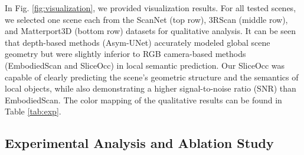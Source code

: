 \documentclass[letterpaper, 10 pt, conference]{ieeeconf}  %
\begin{document}
In Fig. \ref{fig:visualization}, we provided visualization results. For all tested scenes, we selected one scene each from the ScanNet (top row), 3RScan (middle row), and Matterport3D (bottom row) datasets for qualitative analysis. It can be seen that depth-based methods (Asym-UNet) accurately modeled global scene geometry but were slightly inferior to RGB camera-based methods (EmbodiedScan and SliceOcc) in local semantic prediction. Our SliceOcc was capable of clearly predicting the scene's geometric structure and the semantics of local objects, while also demonstrating a higher signal-to-noise ratio (SNR) than EmbodiedScan. The color mapping of the qualitative results can be found in Table \ref{tab:exp}.


\begin{table}[t]
    \centering
    \caption{Ablating the effect of different components.}
    \label{tab:sup1}
\end{table}

\subsection{Experimental Analysis and Ablation Study}
\end{document}
